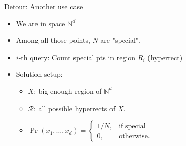 \documentclass{beamer}
\begin{document}
\begin{frame}{Detour: Another use case}
  \begin{itemize}
    \item We are in space $\mathbb{N}^d$
    \vspace{0.2cm}
    \item Among all those points, \(N\) are "special".
    \vspace{0.2cm}
    \item $i$-th query: Count special pts in region \(R_i\) (hyperrect)
    \vspace{0.2cm}
    \item Solution setup:
    \begin{itemize} 
        \item \(X\): \hspace{0.9cm} big enough region of $\mathbb{N}^d$
        \item \(\mathcal{R}\): \hspace{0.9cm} all possible hyperrects of \(X\).
        \item \(
      \Pr(x_1,\dots,x_d)
      =
      \begin{cases}
        1/N, & \text{if special}\\
        0,   & \text{otherwise.}
      \end{cases}
    \)
    \end{itemize}
    
  \end{itemize}
\end{frame}
\end{document}
